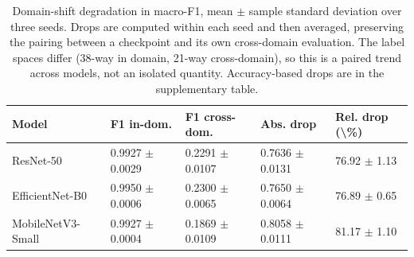 \begin{table}[htbp]
\caption{Domain-shift degradation in macro-F1, mean $\pm$ sample standard deviation over three seeds. Drops are computed within each seed and then averaged, preserving the pairing between a checkpoint and its own cross-domain evaluation. The label spaces differ (38-way in domain, 21-way cross-domain), so this is a paired trend across models, not an isolated quantity. Accuracy-based drops are in the supplementary table.}
\label{tab:degradation-compact}
\footnotesize
\centering
\begin{tabular}{lllll}
\toprule
Model & F1 in-dom. & F1 cross-dom. & Abs. drop & Rel. drop (\textbackslash \%) \\
\midrule
ResNet-50 & 0.9927 $\pm$ 0.0029 & 0.2291 $\pm$ 0.0107 & 0.7636 $\pm$ 0.0131 & 76.92 $\pm$ 1.13 \\
EfficientNet-B0 & 0.9950 $\pm$ 0.0006 & 0.2300 $\pm$ 0.0065 & 0.7650 $\pm$ 0.0064 & 76.89 $\pm$ 0.65 \\
MobileNetV3-Small & 0.9927 $\pm$ 0.0004 & 0.1869 $\pm$ 0.0109 & 0.8058 $\pm$ 0.0111 & 81.17 $\pm$ 1.10 \\
\bottomrule
\end{tabular}
\end{table}

